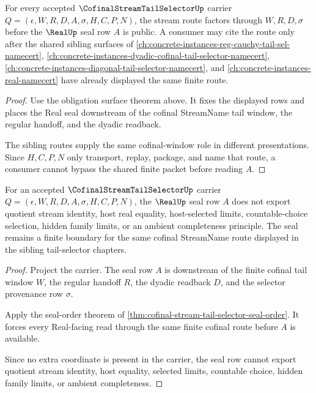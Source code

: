 \begin{theorem}
\label{thm:cofinal-stream-tail-selector-stream-route}
For every accepted $\CofinalStreamTailSelectorUp$ carrier $Q=(\epsilon,W,R,D,A,\sigma,H,C,P,N)$, the stream route factors through $W,R,D,\sigma$ before the $\RealUp$ seal row $A$ is public. A consumer may cite the route only after the shared sibling surfaces of \autoref{ch:concrete-instances-reg-cauchy-tail-sel-namecert}, \autoref{ch:concrete-instances-dyadic-cofinal-tail-selector-namecert}, \autoref{ch:concrete-instances-diagonal-tail-selector-namecert}, and \autoref{ch:concrete-instances-real-namecert} have already displayed the same finite route.
\end{theorem}
\begin{proof}
Use the obligation surface theorem above. It fixes the displayed rows and places the Real seal downstream of the cofinal StreamName tail window, the regular handoff, and the dyadic readback.

The sibling routes supply the same cofinal-window role in different presentations. Since $H,C,P,N$ only transport, replay, package, and name that route, a consumer cannot bypass the shared finite packet before reading $A$.
\end{proof}

\begin{theorem}
\label{thm:cofinal-stream-tail-selector-real-seal-nonescape}
For an accepted $\CofinalStreamTailSelectorUp$ carrier $Q=(\epsilon,W,R,D,A,\sigma,H,C,P,N)$, the $\RealUp$ seal row $A$ does not export quotient stream identity, host real equality, host-selected limits, countable-choice selection, hidden family limits, or an ambient completeness principle. The seal remains a finite boundary for the same cofinal StreamName route displayed in the sibling tail-selector chapters.
\end{theorem}
\begin{proof}
Project the carrier. The seal row $A$ is downstream of the finite cofinal tail window $W$, the regular handoff $R$, the dyadic readback $D$, and the selector provenance row $\sigma$.

Apply the seal-order theorem of \autoref{thm:cofinal-stream-tail-selector-seal-order}. It forces every Real-facing read through the same finite cofinal route before $A$ is available.

Since no extra coordinate is present in the carrier, the seal row cannot export quotient stream identity, host equality, selected limits, countable choice, hidden family limits, or ambient completeness.
\end{proof}

